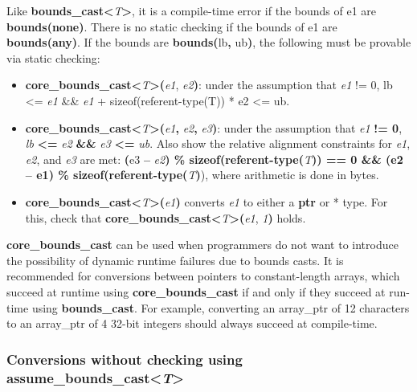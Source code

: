Like \textbf{bounds\_cast\textless{}}\emph{T}\textbf{\textgreater{}}, it
is a compile-time error if the bounds of e1 are \textbf{bounds(none)}.
There is no static checking if the bounds of e1 are
\textbf{bounds(any)}. If the bounds are \textbf{bounds(}lb\textbf{,}
ub\textbf{)}, the following must be provable via static checking:

\begin{itemize}
\item
  \textbf{core\_bounds\_cast\textless{}}\emph{T}\textbf{\textgreater{}(}\emph{e1},
  \emph{e2}\textbf{)}: under the assumption that \emph{e1} != 0, lb
  \textless{}= \emph{e1} \&\& \emph{e1} + sizeof(referent-type(T)) * e2
  \textless{}= ub.
\item
  \textbf{core\_bounds\_cast\textless{}}\emph{T}\textbf{\textgreater{}(}\emph{e1}\textbf{,}
  \emph{e2}\textbf{,} \emph{e3}\textbf{)}: under the assumption that
  \emph{e1} \textbf{!= 0}, \emph{lb} \textbf{\textless{}=} \emph{e2}
  \textbf{\&\&} \emph{e3} \textbf{\textless{}=} \emph{ub}. Also show the
  relative alignment constraints for \emph{e1}, \emph{e2}, and \emph{e3}
  are met: \textbf{(}e3 \textbf{--} \emph{e2}\textbf{) \%
  sizeof(referent-type(}\emph{T}\textbf{)) == 0 \&\& (e2 -- e1) \%
  sizeof(referent-type(}\emph{T}\textbf{)}), where arithmetic is done in
  bytes.
\item
  \textbf{core\_bounds\_cast\textless{}}\emph{T}\textbf{\textgreater{}(}\emph{e1}\textbf{)}
  converts \emph{e1} to either a \textbf{ptr} or * type. For this, check
  that
  \textbf{core\_bounds\_cast\textless{}}\emph{T}\textbf{\textgreater{}(}\emph{e1},
  \emph{1}\textbf{)} holds.
\end{itemize}

\textbf{core\_bounds\_cast} can be used when programmers do not want to
introduce the possibility of dynamic runtime failures due to bounds
casts. It is recommended for conversions between pointers to
constant-length arrays, which succeed at runtime using
\textbf{core\_bounds\_cast} if and only if they succeed at run-time
using \textbf{bounds\_cast}. For example, converting an array\_ptr of 12
characters to an array\_ptr of 4 32-bit integers should always succeed
at compile-time.

\subsubsection{\texorpdfstring{\protect\hypertarget{ux5fToc437460800}{}{\protect\hypertarget{ux5fToc440445481}{}{\protect\hypertarget{ux5fToc440449263}{}{\protect\hypertarget{ux5fToc440551913}{}{}}}}Conversions
without checking using
assume\_bounds\_cast\textless{}\emph{T}\textgreater{}}{Conversions without checking using assume\_bounds\_cast\textless{}T\textgreater{}}}\label{conversions-without-checking-using-assumeux5fboundsux5fcastt}


